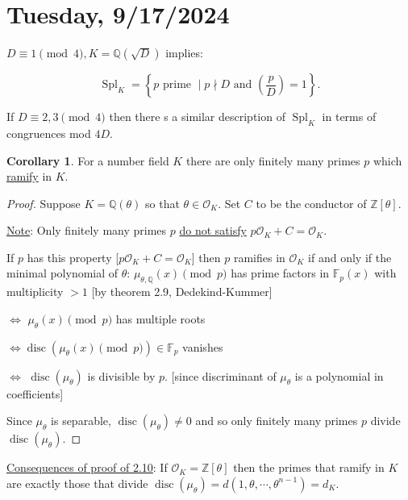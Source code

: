 \documentclass[openany]{amsbook}
\numberwithin{section}{chapter}
\theoremstyle{definition}
\newtheorem{corollary}[theorem]{Corollary}
\begin{document}
\section*{Tuesday, 9/17/2024}

\(D \equiv 1\pmod 4, K = \mathbb{Q} (\sqrt{D})\) implies:

\[
    \operatorname{Spl} _K = \left\{ p \text{ prime } \mid p\nmid D \text{ and } \left( \frac{p}{D} \right) = 1 \right\}.
\]

If \(D \equiv 2, 3 \pmod 4\) then there s a similar description of \(\operatorname{Spl} _K\) in terms of congruences mod \(4D\).

\begin{corollary}
    For a number field \(K\) there are only finitely many primes \(p\) which \underline{ramify} in \(K\).
\end{corollary}

\begin{proof}
    Suppose \(K = \mathbb{Q} (\theta)\) so that \(\theta \in \mathcal{O}_K\). Set \(C\) to be the conductor of \(\mathbb{Z}[\theta]\).

    \underline{Note}: Only finitely many primes \(p\) \underline{do not satisfy} \(p \mathcal{O}_K + C = \mathcal{O}_K\). 

    If \(p\) has this property [\(p \mathcal{O} _K + C = \mathcal{O} _K\)] then \(p\) ramifies in \(\mathcal{O}_K\) if and only if the minimal polynomial of \(\theta \): \(\mu_{\theta , \mathbb{Q}}(x) \pmod p\) has prime factors in \(\mathbb{F} _p(x)\) with multiplicity \(> 1\) [by theorem 2.9, Dedekind-Kummer]
    
    \(\iff\) \(\mu _\theta (x) \pmod p\) has multiple roots

    \(\iff \operatorname{disc}(\mu_\theta (x) \pmod p) \in \mathbb{F}_p\) vanishes

    \(\iff\) \(\operatorname{disc} (\mu_\theta)\) is divisible by \(p\). [since discriminant of \(\mu_\theta\) is a polynomial in coefficients]

    Since \(\mu_\theta\) is separable, \(\operatorname{disc} (\mu_\theta) \neq 0\) and so only finitely many primes \(p\) divide \(\operatorname{disc} (\mu_\theta)\). 
\end{proof}

\underline{Consequences of proof of 2.10}: If \(\mathcal{O}_K = \mathbb{Z} [\theta]\) then the primes that ramify in \(K\) are exactly those that divide \(\operatorname{disc}(\mu_\theta) = d(1,\theta , \cdots , \theta^{n-1}) = d_K\).
\end{document}
